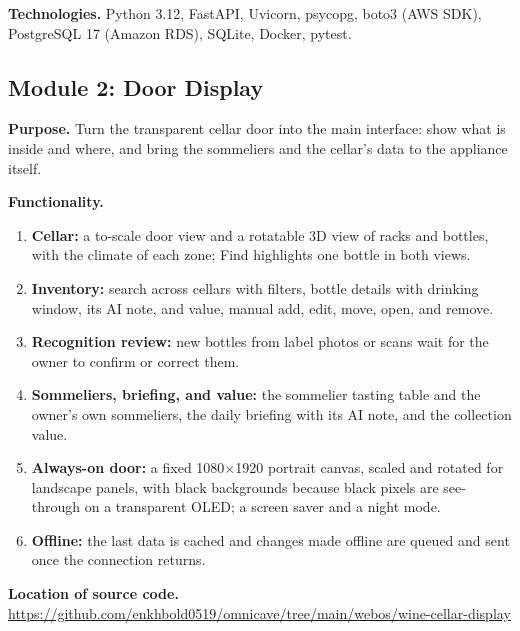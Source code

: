 \documentclass[conference]{IEEEtran}
\begin{document}
\textbf{Technologies.} Python 3.12, FastAPI, Uvicorn, psycopg, boto3 (AWS SDK), PostgreSQL 17 (Amazon RDS), SQLite, Docker, pytest.

\subsection{Module 2: Door Display}
\textbf{Purpose.} Turn the transparent cellar door into the main interface: show what is inside and where, and bring the sommeliers and the cellar's data to the appliance itself.

\textbf{Functionality.}
\begin{enumerate}
    \item \textbf{Cellar:} a to-scale door view and a rotatable 3D view of racks and bottles, with the climate of each zone; Find highlights one bottle in both views.
    \item \textbf{Inventory:} search across cellars with filters, bottle details with drinking window, its AI note, and value, manual add, edit, move, open, and remove.
    \item \textbf{Recognition review:} new bottles from label photos or scans wait for the owner to confirm or correct them.
    \item \textbf{Sommeliers, briefing, and value:} the sommelier tasting table and the owner's own sommeliers, the daily briefing with its AI note, and the collection value.
    \item \textbf{Always-on door:} a fixed 1080$\times$1920 portrait canvas, scaled and rotated for landscape panels, with black backgrounds because black pixels are see-through on a transparent OLED; a screen saver and a night mode.
    \item \textbf{Offline:} the last data is cached and changes made offline are queued and sent once the connection returns.
\end{enumerate}

\textbf{Location of source code.} \url{https://github.com/enkhbold0519/omnicave/tree/main/webos/wine-cellar-display}
\end{document}
